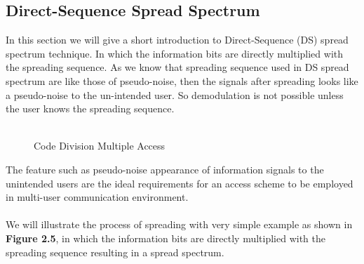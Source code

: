 \subsection{Direct-Sequence Spread Spectrum}
In this section we will give a short introduction to Direct-Sequence (DS) spread spectrum technique. In which the information bits are directly multiplied with the spreading sequence. As we know that spreading sequence used in DS spread spectrum are like those of pseudo-noise, then the signals after spreading looks like a pseudo-noise to the un-intended user. So demodulation is not possible unless the user knows the spreading sequence.\\ \\
\begin{figure}[htb]
  \centerline{  }
  \caption{Code Division Multiple Access}
\end{figure}
The feature such as pseudo-noise appearance of information signals to the unintended users are the ideal requirements for an access scheme to be employed in multi-user communication environment. \\ \\
We will illustrate the process of spreading with very simple example as shown in \textbf{Figure 2.5}, in which the information bits are directly multiplied with the spreading sequence resulting in a spread spectrum.
